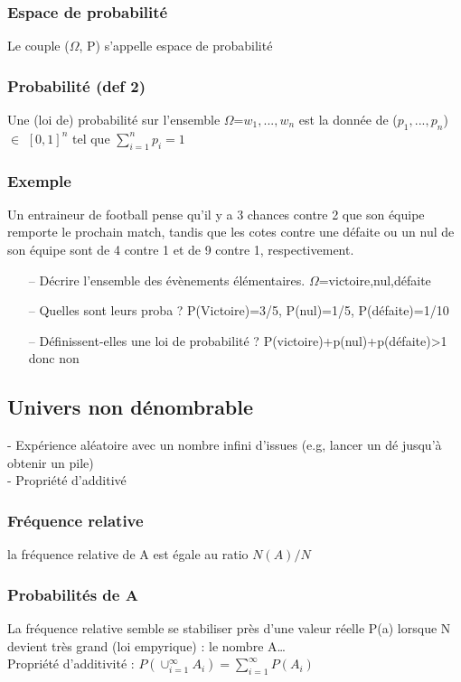\documentclass{article}
\begin{document}
            \subsubsection{Espace de probabilité}
                Le couple ($\Omega$, P) s'appelle espace de probabilité
            \subsubsection{Probabilité (def 2)}
                Une (loi de) probabilité sur l'ensemble $\Omega$={$w_1,...,w_n$} est 
                la donnée de ($p_1,...,p_n$) $\in$ $[0,1]^n$ tel que $\sum_{i=1}^{n} p_i=1$
            \subsubsection{Exemple}
                Un entraineur de football pense qu'il y a 3 chances contre 2 que son 
                équipe remporte le prochain match, tandis que les cotes contre une 
                défaite ou un nul de son équipe sont de 4 contre 1 et de 9 contre 1, respectivement.
                \begin{itemize}
                    \item[--] Décrire l'ensemble des évènements élémentaires.
                    $\Omega$={victoire,nul,défaite}
                    \item[--] Quelles sont leurs proba ? 
                    P(Victoire)=3/5, P(nul)=1/5, P(défaite)=1/10
                    \item[--] Définissent-elles une loi de probabilité ? 
                    P(victoire)+p(nul)+p(défaite)>1 donc non
                \end{itemize}
        \subsection{Univers non dénombrable}
            - Expérience aléatoire avec un nombre infini d'issues (e.g, lancer un dé
            jusqu'à obtenir un pile)\\
            - Propriété d'additivé
            \subsubsection{Fréquence relative}
                la fréquence relative de A est égale au ratio $N(A)/N$
            \subsubsection{Probabilités de A}
                La fréquence relative semble se stabiliser près d'une valeur réelle
                P(a) lorsque N devient très grand (loi empyrique) : le nombre A\dots\\
                Propriété d'additivité : $P(\cup_{i=1}^{\infty} A_{i}) = \sum_{i=1}^{\infty} P(A_{i})$
\end{document}
